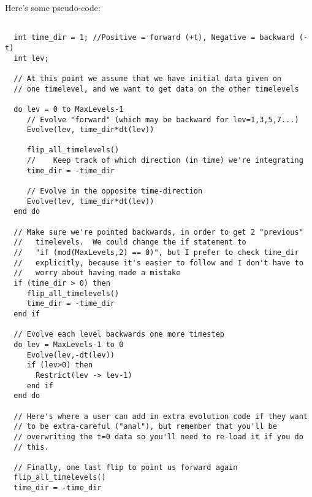 \documentclass{article}
\begin{document}
Here's some pseudo-code:
\begin{verbatim}

  int time_dir = 1; //Positive = forward (+t), Negative = backward (-t)
  int lev;

  // At this point we assume that we have initial data given on
  // one timelevel, and we want to get data on the other timelevels

  do lev = 0 to MaxLevels-1
     // Evolve "forward" (which may be backward for lev=1,3,5,7...)
     Evolve(lev, time_dir*dt(lev))

     flip_all_timelevels()
     //    Keep track of which direction (in time) we're integrating
     time_dir = -time_dir

     // Evolve in the opposite time-direction
     Evolve(lev, time_dir*dt(lev))
  end do

  // Make sure we're pointed backwards, in order to get 2 "previous"
  //   timelevels.  We could change the if statement to 
  //   "if (mod(MaxLevels,2) == 0)", but I prefer to check time_dir 
  //   explicitly, because it's easier to follow and I don't have to
  //   worry about having made a mistake
  if (time_dir > 0) then
     flip_all_timelevels()
     time_dir = -time_dir
  end if

  // Evolve each level backwards one more timestep
  do lev = MaxLevels-1 to 0
     Evolve(lev,-dt(lev))
     if (lev>0) then
       Restrict(lev -> lev-1)
     end if
  end do

  // Here's where a user can add in extra evolution code if they want 
  // to be extra-careful ("anal"), but remember that you'll be 
  // overwriting the t=0 data so you'll need to re-load it if you do
  // this.   

  // Finally, one last flip to point us forward again
  flip_all_timelevels()
  time_dir = -time_dir
\end{verbatim}
\end{document}
